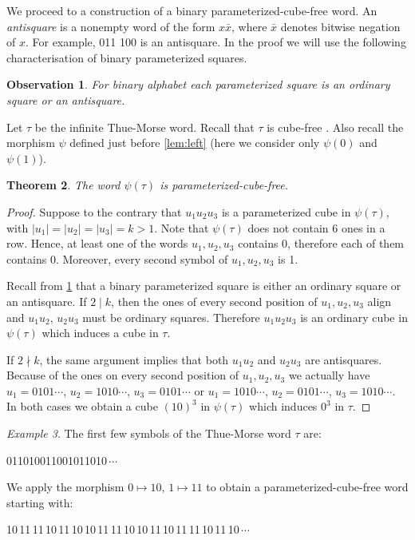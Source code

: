 \documentclass{article}
\theoremstyle{plain}
\newtheorem{theorem}{Theorem}[section]
\newtheorem{observation}[theorem]{Observation}
\theoremstyle{definition}
\theoremstyle{remark}
\newtheorem{example}[theorem]{Example}
\newcommand{\lleft}{\psi}
\begin{document}
  We proceed to a construction of a binary parameterized-cube-free word.
  An \emph{antisquare} is a nonempty word of the form $x\bar{x}$, where $\bar{x}$ denotes bitwise negation of $x$.
  For example, 011 100 is an antisquare.
  In the proof we will use the following characterisation of binary parameterized squares.
  
  \begin{observation}\label{obs:anti}
    For binary alphabet each parameterized square is an ordinary square or an antisquare.
  \end{observation}

  Let $\tau$ be the infinite Thue-Morse word.
  Recall that $\tau$ is cube-free \cite{Thue2}.
  Also recall the morphism $\lleft$ defined just before \cref{lem:left}
  (here we consider only $\lleft(0)$ and $\lleft(1)$).

  \begin{theorem}
    The word $\lleft(\tau)$ is parameterized-cube-free.
  \end{theorem}
  \begin{proof}
    Suppose to the contrary that $u_1u_2u_3$ is a parameterized cube in $\lleft(\tau)$, with
    $|u_1|=|u_2|=|u_3|=k>1$.
    Note that $\lleft(\tau)$ does not contain 6 ones in a row.
    Hence, at least one of the words $u_1,u_2,u_3$ contains 0, therefore each of them contains 0.
    Moreover, every second symbol of $u_1,u_2,u_3$ is 1.

    Recall from \cref{obs:anti} that a binary parameterized square is either
    an ordinary square or an antisquare.
    If $2 \mid k$, then the ones of every second position of $u_1,u_2,u_3$ align
    and $u_1u_2$, $u_2u_3$ must be ordinary squares.
    Therefore $u_1u_2u_3$ is an ordinary cube in $\lleft(\tau)$ which induces a cube in $\tau$.

    If $2 \nmid k$, the same argument implies that both $u_1u_2$ and $u_2u_3$ are antisquares.
    Because of the ones on every second position of $u_1,u_2,u_3$
    we actually have $u_1=0101\cdots$, $u_2=1010\cdots$, $u_3=0101\cdots$ or
    $u_1=1010\cdots$, $u_2=0101\cdots$, $u_3=1010\cdots$.
    In both cases we obtain a cube $(10)^3$ in $\lleft(\tau)$ which induces  $0^3$ in $\tau$.
  \end{proof}

  \begin{example}
    The first few symbols of the Thue-Morse word $\tau$ are:
    \begin{center}
      011010011001011010\,$\cdots$
    \end{center}
    We apply the morphism $0\mapsto 10,\, 1\mapsto 11$ to obtain a parameterized-cube-free word
    starting with:
    \begin{center}
      10\,11\,11\,10\,11\,10\,10\,11\,11\,10\,10\,11\,10\,11\,11\,10\,11\,10\,$\cdots$
    \end{center}
  \end{example}
\end{document}
